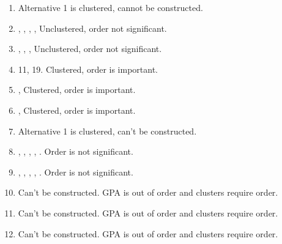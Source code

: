 




\homeworkheader{\classnameandsection}

\begin{problem}{8.4}
  \begin{solution}
    \begin{enumerate}
      \item Alternative 1 is clustered, cannot be constructed.\\
      \item
        ,
        ,
        ,
        ,
      Unclustered, order not significant.\\
      \item
        ,
        ,
        ,
      Unclustered, order not significant.\\
      \item 11, 19. Clustered, order is important.\\
      \item
        ,   Clustered, order is important.\\
      \item
        ,   Clustered, order is important.\\
      \item Alternative 1 is clustered, can't be constructed. \\
      \item
        ,
        ,
        ,
        ,
        .
        Order is not significant.\\
      \item
        ,
        ,
        ,
        ,
        .
        Order is not significant.\\
      \item Can't be constructed. GPA is out of order and clusters require order.\\
      \item Can't be constructed. GPA is out of order and clusters require order.\\
      \item Can't be constructed. GPA is out of order and clusters require order.
    \end{enumerate}
  \end{solution}
\end{problem}

